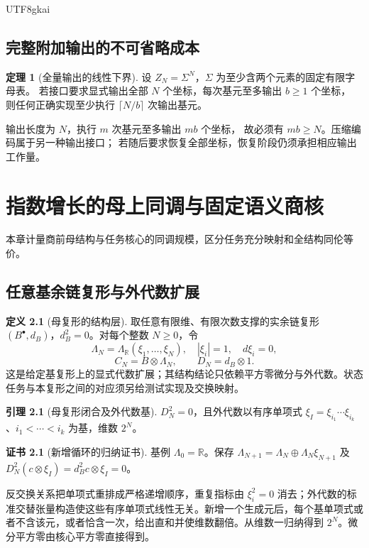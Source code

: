 \documentclass[12pt]{report}
\makeatletter
\theoremstyle{definition}
\newtheorem{definition}{定义}[chapter]
\newtheorem{theorem}{定理}[chapter]
\newtheorem{lemma}{引理}[chapter]
\newtheorem{Certificate}{证书}[chapter]
\renewenvironment{proof}[1][\proofname]{\par
  \pushQED{\qed}\normalfont
  \topsep6\p@\@plus6\p@\relax
  \trivlist
  \item[\hskip\labelsep\normalfont #1\@addpunct{.}]\ignorespaces
}{
  \popQED\endtrivlist\@endpefalse
}
\newcommand{\RR}{\mathbb R}
\makeatother
\begin{document}
\begin{CJK*}{UTF8}{gkai}
\section{完整附加输出的不可省略成本}
\begin{theorem}[全量输出的线性下界]
\label{thm:outputlb}
设 \(Z_N=\Sigma^N\)，\(\Sigma\) 为至少含两个元素的固定有限字母表。
若接口要求显式输出全部 \(N\) 个坐标，每次基元至多输出 \(b\ge1\) 个坐标，
则任何正确实现至少执行 \(\lceil N/b\rceil\) 次输出基元。
\end{theorem}
\begin{proof}
输出长度为 \(N\)，执行 \(m\) 次基元至多输出 \(mb\) 个坐标，
故必须有 \(mb\ge N\)。压缩编码属于另一种输出接口；
若随后要求恢复全部坐标，恢复阶段仍须承担相应输出工作量。
\end{proof}

\chapter{指数增长的母上同调与固定语义商核}
\label{sec:growth}
本章计量商前母结构与任务核心的同调规模，区分任务充分映射和全结构同伦等价。
\section{任意基余链复形与外代数扩展}
\begin{definition}[母复形的结构层]
取任意有限维、有限次数支撑的实余链复形 \((B^\bullet,d_B)\)，\(d_B^2=0\)。对每个整数 \(N\ge0\)，令
\[
\Lambda_N=\Lambda_{\RR}(\xi_1,\ldots,\xi_N),\quad |\xi_i|=1,\quad d\xi_i=0,
\]
\[
C_N=B\otimes\Lambda_N,\qquad D_N=d_B\otimes1.
\]
这是给定基复形上的显式代数扩展；其结构结论只依赖平方零微分与外代数。状态任务与本复形之间的对应须另给测试实现及交换映射。
\end{definition}

\begin{lemma}[母复形闭合及外代数基]
\label{lem:exterior}
\(D_N^2=0\)，且外代数以有序单项式
\(\xi_I=\xi_{i_1}\cdots\xi_{i_k}\)、\(i_1<\cdots<i_k\) 为基，维数 \(2^N\)。
\end{lemma}
\begin{Certificate}[新增循环的归纳证书]
基例 \(\Lambda_0=\RR\)。保存
\(\Lambda_{N+1}=\Lambda_N\oplus\Lambda_N\xi_{N+1}\)
及 \(D_N^2(c\otimes\xi_I)=d_B^2c\otimes\xi_I=0\)。
\end{Certificate}
\begin{proof}
反交换关系把单项式重排成严格递增顺序，重复指标由 \(\xi_i^2=0\) 消去；外代数的标准交替张量构造使这些有序单项式线性无关。新增一个生成元后，每个基单项式或者不含该元，或者恰含一次，给出直和并使维数翻倍。从维数一归纳得到 \(2^N\)。微分平方零由核心平方零直接得到。
\end{proof}


\end{CJK*}
\end{document}
